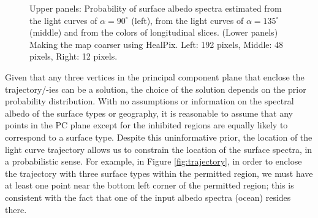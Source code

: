 \documentclass[iop,numberedappendix,apj]{emulateapj}
\begin{document}
\begin{figure}[tbh!]
    \caption{Upper panels: Probability of surface albedo spectra estimated from the light curves of $\alpha = 90^{\circ }$ (left), from the light curves of $\alpha = 135^{\circ }$ (middle) and from the colors of longitudinal slices. (Lower panels) Making the map coarser using HealPix. Left: 192 pixels, Middle: 48 pixels, Right: 12 pixels. }
\label{fig:PCplane}
\end{figure}


Given that any three vertices in the principal component plane that enclose the trajectory/-ies can be a solution, the choice of the solution depends on the prior probability distribution. 
With no assumptions or information on the spectral albedo of the surface types or geography, it is reasonable to assume that any points in the PC plane except for the inhibited regions are equally likely to correspond to a surface type. 
Despite this uninformative prior, the location of the light curve trajectory allows us to constrain the location of the surface spectra, in a probabilistic sense. 
For example, in Figure \ref{fig:trajectory}, in order to enclose the trajectory with three surface types within the permitted region, we must have at least one point near the bottom left corner of the permitted region; this is consistent with the fact that one of the input albedo spectra (ocean) resides there. 
\end{document}
